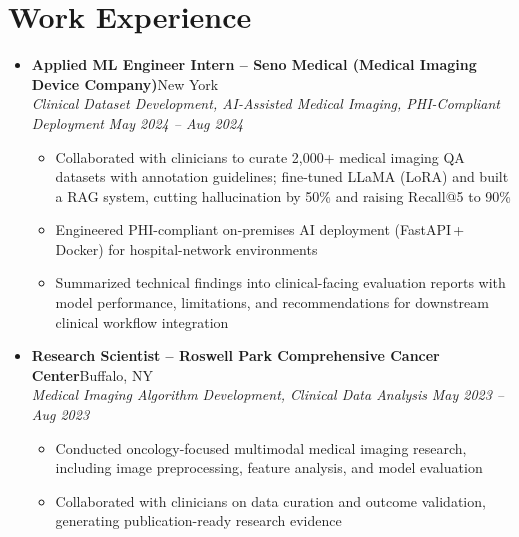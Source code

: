 \documentclass[letterpaper,10pt]{article}
\begin{document}
\vspace{-2pt}

\section{Work Experience}

\begin{itemize}[leftmargin=0in, label={}]

  \item
  \textbf{Applied ML Engineer Intern -- Seno Medical (Medical Imaging Device Company)}\hfill New York \\
  \textit{Clinical Dataset Development, AI-Assisted Medical Imaging, PHI-Compliant Deployment} \hfill \textit{May 2024 -- Aug 2024}
  \begin{itemize}[leftmargin=0.2in, topsep=1pt]
    \item Collaborated with clinicians to curate 2,000+ medical imaging QA datasets with annotation guidelines; fine-tuned LLaMA (LoRA) and built a RAG system, cutting hallucination by 50\% and raising Recall@5 to 90\%
    \item Engineered PHI-compliant on-premises AI deployment (FastAPI\,+\,Docker) for hospital-network environments
    \item Summarized technical findings into clinical-facing evaluation reports with model performance, limitations, and recommendations for downstream clinical workflow integration
  \end{itemize}

  \vspace{3pt}

  \item
  \textbf{Research Scientist -- Roswell Park Comprehensive Cancer Center}\hfill Buffalo, NY \\
  \textit{Medical Imaging Algorithm Development, Clinical Data Analysis} \hfill \textit{May 2023 -- Aug 2023}
  \begin{itemize}[leftmargin=0.2in, topsep=1pt]
    \item Conducted oncology-focused multimodal medical imaging research, including image preprocessing, feature analysis, and model evaluation
    \item Collaborated with clinicians on data curation and outcome validation, generating publication-ready research evidence
  \end{itemize}


\end{itemize}
\end{document}
